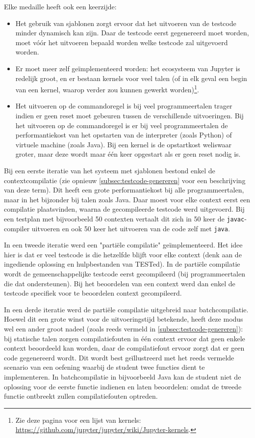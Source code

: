 Elke medaille heeft ook een keerzijde:
\begin{itemize}
    \item Het gebruik van sjablonen zorgt ervoor dat het uitvoeren van de testcode minder dynamisch kan zijn.
    Daar de testcode eerst gegenereerd moet worden, moet vóór het uitvoeren bepaald worden welke testcode zal uitgevoerd worden.
    \item Er moet meer zelf geïmplementeerd worden: het ecosysteem van Jupyter is redelijk groot, en er bestaan kernels voor veel talen (of in elk geval een begin van een kernel, waarop verder zou kunnen gewerkt worden)\footnote{Zie deze pagina voor een lijst van kernels: \url{https://github.com/jupyter/jupyter/wiki/Jupyter-kernels}.}.
    \item Het uitvoeren op de commandoregel is bij veel programmeertalen trager indien er geen reset moet gebeuren tussen de verschillende uitvoeringen.
    Bij het uitvoeren op de commandoregel is er bij veel programmeertalen de performantiekost van het opstarten van de interpreter (zoals Python) of virtuele machine (zoals Java).
    Bij een kernel is de opstartkost weliswaar groter, maar deze wordt maar één keer opgestart als er geen reset nodig is.
\end{itemize}

Bij een eerste iteratie van het systeem met sjablonen bestond enkel de contextcompilatie (zie opnieuw \cref{subsec:testcode-genereren} voor een beschrijving van deze term).
Dit heeft een grote performantiekost bij alle programmeertalen, maar in het bijzonder bij talen zoals Java.
Daar moest voor elke context eerst een compilatie plaatsvinden, waarna de gecompileerde testcode werd uitgevoerd.
Bij een testplan met bijvoorbeeld 50 contexten vertaalt dit zich in 50 keer de \texttt{javac}-compiler uitvoeren en ook 50 keer het uitvoeren van de code zelf met \texttt{java}.

In een tweede iteratie werd een "partiële compilatie" geïmplementeerd.
Het idee hier is dat er veel testcode is die hetzelfde blijft voor elke context (denk aan de ingediende oplossing en hulpbestanden van TESTed).
In de partiële compilatie wordt de gemeenschappelijke testcode eerst gecompileerd (bij programmeertalen die dat ondersteunen).
Bij het beoordelen van een context werd dan enkel de testcode specifiek voor te beoordelen context gecompileerd.

In een derde iteratie werd de partiële compilatie uitgebreid naar batchcompilatie.
Hoewel dit een grote winst voor de uitvoeringstijd betekende, heeft deze modus wel een ander groot nadeel (zoals reeds vermeld in \cref{subsec:testcode-genereren}): bij statische talen zorgen compilatiefouten in één context ervoor dat geen enkele context beoordeeld kan worden, daar de compilatiefout ervoor zorgt dat er geen code gegenereerd wordt.
Dit wordt best geïllustreerd met het reeds vermelde scenario van een oefening waarbij de student twee functies dient te implementeren.
In batchcompilatie in bijvoorbeeld Java kan de student niet de oplossing voor de eerste functie indienen en laten beoordelen: omdat de tweede functie ontbreekt zullen compilatiefouten optreden.

